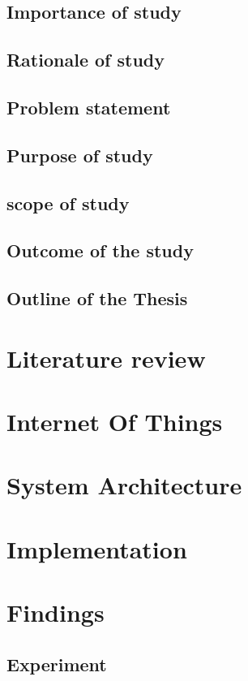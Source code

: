 \documentclass[oneside,12pt,a4paper,final]{book}
\begin{document}
\section{Importance of study}
\section{Rationale of study}
\section{Problem statement}
\section{Purpose of study}
\section{scope of study}
\section{Outcome of the study}
\section{Outline of the Thesis}

\chapter{Literature review}

\chapter{Internet Of Things}


\chapter{System Architecture}

\chapter{Implementation}


\chapter{Findings}
\section{Experiment}
\end{document}
